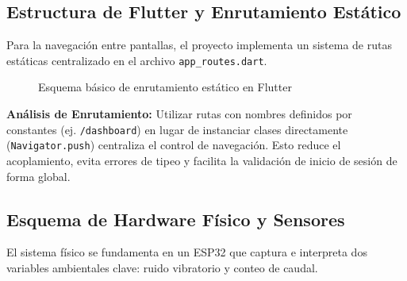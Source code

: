 \documentclass[11pt,a4paper]{article}
\begin{document}
\subsection{Estructura de Flutter y Enrutamiento Estático}

Para la navegación entre pantallas, el proyecto implementa un sistema de rutas estáticas centralizado en el archivo \texttt{app\_routes.dart}. 

\begin{figure}[htpb]
    \centering
    \caption{Esquema básico de enrutamiento estático en Flutter}
\end{figure}

\textbf{Análisis de Enrutamiento:} Utilizar rutas con nombres definidos por constantes (ej. \texttt{/dashboard}) en lugar de instanciar clases directamente (\texttt{Navigator.push}) centraliza el control de navegación. Esto reduce el acoplamiento, evita errores de tipeo y facilita la validación de inicio de sesión de forma global.

\subsection{Esquema de Hardware Físico y Sensores}

El sistema físico se fundamenta en un ESP32 que captura e interpreta dos variables ambientales clave: ruido vibratorio y conteo de caudal.
\end{document}
